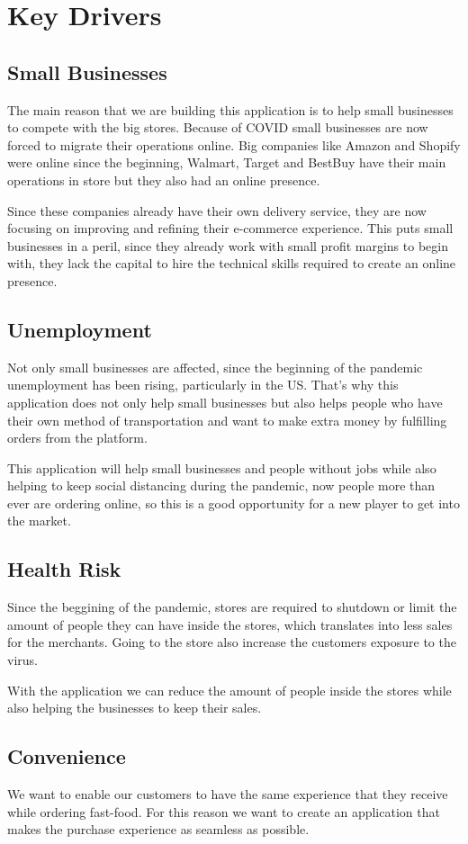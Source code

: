 \section{Key Drivers}
\subsection{Small Businesses}
The main reason that we are building this application is to help small 
businesses to compete with the big stores. Because of COVID small businesses 
are now forced to migrate their operations online. Big companies like Amazon 
and Shopify were online since the beginning, Walmart, Target and BestBuy 
have their main operations in store but they also had an online 
presence. \newline

\noindent Since these companies already have their own delivery service, 
they are now focusing on improving and refining their e-commerce experience. 
This puts small businesses in a peril, since they already work with small 
profit margins to begin with, they lack the capital to hire the technical 
skills required to create an online presence. \newline

\subsection{Unemployment}
\noindent Not only small businesses are affected, since the beginning of 
the pandemic unemployment has been rising, particularly in the US. That’s why 
this application does not only help small businesses but also helps people 
who have their own method of transportation and want to make extra money 
by fulfilling orders from the platform.\newline

\noindent This application will help small businesses and people without jobs 
while also helping to keep social distancing during the pandemic, 
now people more than ever are ordering online, so this is a good opportunity 
for a new player to get into the market.

\subsection{Health Risk}
\noindent Since the beggining of the pandemic, stores are required to shutdown 
or limit the amount of people they can have inside the stores, which translates 
into less sales for the merchants. Going to the store also increase the 
customers exposure to the virus. \newline

\noindent With the application we can reduce the amount of people inside the 
stores while also helping the businesses to keep their sales.

\subsection{Convenience}
\noindent We want to enable our customers to have the same experience that 
they receive while ordering fast-food. For this reason we want to create 
an application that makes the purchase experience as seamless as possible.